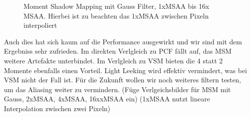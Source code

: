 \documentclass[runningheaders,a4paper]{llncs}
\begin{document}
\begin{figure}
	\centering
	
	\caption{Moment Shadow Mapping mit Gauss Filter, 1xMSAA bis 16x MSAA. Hierbei ist zu beachten das 1xMSAA zwischen Pixeln interpoliert}
\end{figure}

Auch dies hat sich kaum auf die Performance ausgewirkt und wir sind mit dem Ergebniss sehr zufrieden.
Im direkten Verlgleich zu PCF fällt auf, das MSM weitere Artefakte unterbindet. Im Verlgleich zu VSM bieten die 4 statt 2 Momente ebenfalls einen Vorteil. Light Leeking wird effektiv vermindert, was bei VSM nicht der Fall ist.
Für die Zukunft wollen wir noch weiteres filtern testen, um das Aliasing weiter zu vermindern.
(Füge Verlgeichsbilder für MSM mit Gauss, 2xMSAA, 4xMSAA, 16xxMSAA ein)
(1xMSAA nutzt lineare Interpolation zwischen zwei Pixeln)
\end{document}
